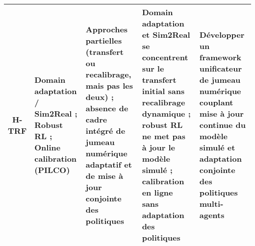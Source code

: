 \begin{table}[H]
{\begin{tabularx}{\textwidth}{cXXXX}
      \textbf{H-TRF}
       & Domain adaptation / Sim2Real ; Robust RL ; Online calibration (PILCO)
       & Approches partielles (transfert ou recalibrage, mais pas les deux) ; absence de cadre intégré de jumeau numérique adaptatif et de mise à jour conjointe des politiques
       & Domain adaptation et Sim2Real se concentrent sur le transfert initial sans recalibrage dynamique ; robust RL ne met pas à jour le modèle simulé ; calibration en ligne sans adaptation des politiques
       & Développer un framework unificateur de jumeau numérique couplant mise à jour continue du modèle simulé et adaptation conjointe des politiques multi-agents                                            \\
      \hline
    \end{tabularx}
  }
\end{table}
